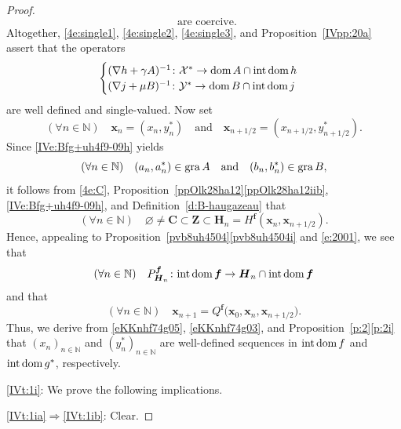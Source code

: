 \documentclass[a4paper,11pt,fleqn]{article}
\newcommand{\XX}{\ensuremath{{\mathcal X}}}
\newcommand{\YY}{\ensuremath{{\mathcal Y}}}
\newcommand{\emp}{\ensuremath{{\varnothing}}}
\newcommand{\NN}{\ensuremath{\mathbb N}}
\newcommand{\dom}{\ensuremath{\text{\rm dom}\,}}
\newcommand{\intdom}{\ensuremath{\text{\rm int\,dom}\,}}
\newcommand{\gra}{\ensuremath{\text{\rm gra}\,}}
\theoremstyle{plain}{\theorembodyfont{\rmfamily}%
\newtheorem{conjecture}[theorem]{Conjecture}}
\theoremstyle{plain}{\theorembodyfont{\rmfamily}%
\newtheorem{example}[theorem]{Example}}
\theoremstyle{plain}{\theorembodyfont{\rmfamily}%
\newtheorem{remark}[theorem]{Remark}}
\theoremstyle{plain}{\theorembodyfont{\rmfamily}%
\newtheorem{algorithm}[theorem]{Algorithm}}
\theoremstyle{plain}{\theorembodyfont{\rmfamily}%
\newtheorem{condition}[theorem]{Condition}}
\theoremstyle{plain}{\theorembodyfont{\rmfamily}%
\newtheorem{definition}[theorem]{Definition}}
\theoremstyle{plain}{\theorembodyfont{\rmfamily}
\newtheorem{problem}[theorem]{Problem}}
\theoremstyle{plain}{\theorembodyfont{\rmfamily}
\newtheorem{notation}[theorem]{Notation}}
\numberwithin{equation}{section}
\begin{document}
\begin{proof}
\begin{equation}
\;\;\text{are coercive}.
\end{equation}
Altogether, \eqref{4e:single1}, \eqref{4e:single2}, 
\eqref{4e:single3}, and Proposition~\ref{IVpp:20a} assert 
that the operators
\begin{equation}
\label{4:e12}
\begin{cases}
(\nabla h+\gamma A)^{-1}\colon\XX^*\to\dom A\cap\intdom h\\
(\nabla j+\mu B)^{-1}\colon\YY^*\to\dom B\cap\intdom j
\end{cases}
\end{equation}
are well defined and single-valued. Now set
\begin{equation}
\label{eKKnhf74g05}
(\forall n\in\NN)\quad
\boldsymbol{x}_n=(x_n,y_n^*)\quad\text{and}\quad
\boldsymbol{x}_{n+1/2}=(x_{n+1/2},y_{n+1/2}^*).
\end{equation}
Since \eqref{IVe:Bfg+uh4f9-09h} yields
\begin{equation}
\label{eKKnhf74g04}
(\forall n\in\NN)\quad
(a_n,a_n^*)\in\gra A\quad\text{and}\quad (b_n,b_n^*)\in\gra B,
\end{equation}
it follows from \eqref{4e:C}, 
Proposition~\ref{ppOlk28ha12}\ref{ppOlk28ha12iib},
\eqref{IVe:Bfg+uh4f9-09h}, and 
Definition~\ref{d:B-haugazeau} that
\begin{equation}
\label{eKKnhf74g03}
(\forall n\in\NN)\quad
\emp\neq\boldsymbol{C}\subset\boldsymbol{Z}\subset\boldsymbol{H}_n
=H^{\boldsymbol{f}}(\boldsymbol{x}_n,\boldsymbol{x}_{n+1/2}).
\end{equation}
Hence, appealing to 
Proposition~\ref{pvb8uh4504}\ref{pvb8uh4504i} and 
\eqref{e:2001}, we see that
\begin{equation}
\label{IVe:32a}
(\forall n\in\NN)\quad
P_{\boldsymbol{H}_n}^{\boldsymbol{f}}
\colon\intdom\boldsymbol{f}\to
\boldsymbol{H}_n\cap\intdom\boldsymbol{f}
\end{equation}
and that
\begin{equation}
\label{eKKnhf74g04i}
(\forall n\in\NN)\quad
\boldsymbol{x}_{n+1}=Q^{\boldsymbol{f}}
\big(\boldsymbol{x}_0,\boldsymbol{x}_n,\boldsymbol{x}_{n+1/2}\big).
\end{equation}
Thus, we derive from 
\eqref{eKKnhf74g05}, \eqref{eKKnhf74g03}, and 
Proposition~\ref{p:2}\ref{p:2i} that
$(x_n)_{n\in\NN}$ and $(y_n^*)_{n\in\NN}$ are well-defined
sequences in $\intdom f$ and $\intdom g^*$, respectively.

\ref{IVt:1i}: We prove the following implications.

\ref{IVt:1ia}$\Rightarrow$\ref{IVt:1ib}: Clear.


\end{proof}
\end{document}
